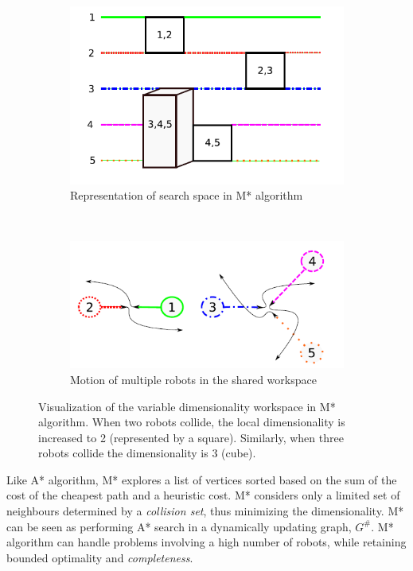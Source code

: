 \begin{figure}
    \centering
    \begin{subfigure}[b]{0.4\textwidth}
        \includegraphics[width=\textwidth]{./images/m_star_a.png}
        \caption{Representation of search space in M* algorithm}
        \label{fig:mstara}
    \end{subfigure}
    ~ %
    \begin{subfigure}[b]{0.55\textwidth}
        \includegraphics[width=\textwidth]{./images/m_star_b.png}
        \caption{Motion of multiple robots in the shared workspace}
        \label{fig:mstarb}
    \end{subfigure}
    \caption{Visualization of the variable dimensionality workspace in M* algorithm. When two robots collide, the local dimensionality is increased to 2 (represented by a square). Similarly, when three robots collide the dimensionality is 3 (cube). \cite{wagner2011m} }\label{fig:mstar}
\end{figure}

Like A* algorithm, M* explores a list of vertices sorted based on the sum of the cost of the cheapest path and a heuristic cost. M* considers only a limited set of neighbours determined by a \textit{collision set}, thus minimizing the dimensionality. M* can be seen as performing A* search in a  dynamically updating graph, $G^\#$. M* algorithm can handle problems involving a high number of robots, while retaining bounded optimality and \textit{completeness}. 


